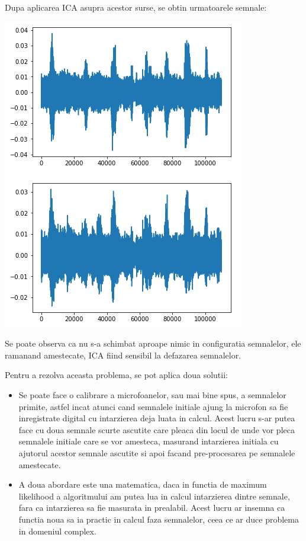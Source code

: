 \documentclass[12pt,oneside]{article}
\begin{document}
 Dupa aplicarea ICA asupra acestor surse, se obtin urmatoarele semnale:
\begin{center}
	\includegraphics[scale=1]{real_separated}
 \end{center}

 Se poate observa ca nu s-a schimbat aproape nimic in configuratia semnalelor, ele ramanand amestecate, ICA fiind sensibil la defazarea semnalelor.

 Pentru a rezolva aceasta problema, se pot aplica doua solutii:
 \begin{itemize}
	\item{Se poate face o calibrare a microfoanelor, sau mai bine spus, a semnalelor primite, astfel incat atunci cand semnalele initiale ajung la microfon sa fie inregistrate digital cu intarzierea deja luata in calcul. Acest lucru s-ar putea face cu doua semnale scurte ascutite care pleaca din locul de unde vor pleca semnalele initiale care se vor amesteca, masurand intarzierea initiala cu ajutorul acestor semnale ascutite si apoi facand pre-procesarea pe semnalele amestecate.} 
	\item{A doua abordare este una matematica, daca in functia de maximum likelihood a algoritmului am putea lua in calcul intarzierea dintre semnale, fara ca intarzierea sa fie masurata in prealabil. Acest lucru ar insemna ca functia noua sa ia practic in calcul faza semnalelor, ceea ce ar duce problema in domeniul complex.}
 \end{itemize}
\end{document}
